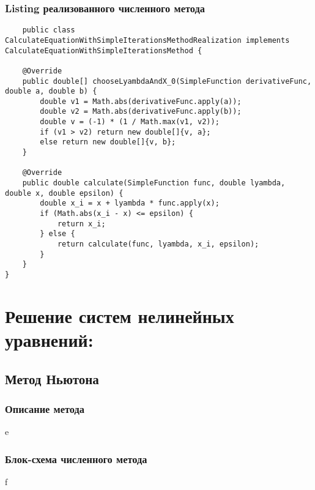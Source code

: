 \subsubsection{Listing реализованного численного метода}
\begin{verbatim}
    public class CalculateEquationWithSimpleIterationsMethodRealization implements CalculateEquationWithSimpleIterationsMethod {

    @Override
    public double[] chooseLyambdaAndX_0(SimpleFunction derivativeFunc, double a, double b) {
        double v1 = Math.abs(derivativeFunc.apply(a));
        double v2 = Math.abs(derivativeFunc.apply(b));
        double v = (-1) * (1 / Math.max(v1, v2));
        if (v1 > v2) return new double[]{v, a};
        else return new double[]{v, b};
    }

    @Override
    public double calculate(SimpleFunction func, double lyambda, double x, double epsilon) {
        double x_i = x + lyambda * func.apply(x);
        if (Math.abs(x_i - x) <= epsilon) {
            return x_i;
        } else {
            return calculate(func, lyambda, x_i, epsilon);
        }
    }
}

\end{verbatim}


\section{Решение систем нелинейных уравнений:}

\subsection{Метод Ньютона}

\subsubsection{Описание метода}
e

\subsubsection{Блок-схема численного метода}
f

